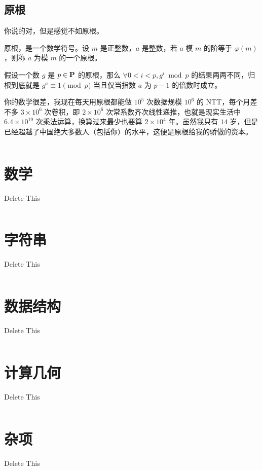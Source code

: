 \documentclass[twoside]{article}
\begin{document}
\subsection{原根}
 你说的对，但是感觉不如原根。\par 原根，是一个数学符号。设 $m$ 是正整数，$a$
 是整数，若 $a$ 模 $m$ 的阶等于 $\varphi(m)$，则称 $a$ 为模 $m$
 的一个原根。\par 假设一个数 $g$ 是 $p\in\textbf P$ 的原根，那么 $\forall
 0<i<p,g^i \bmod p$ 的结果两两不同，归根到底就是 $g^a \equiv 1 \pmod p$
 当且仅当指数 $a$ 为 $p-1$ 的倍数时成立。\par
 你的数学很差，我现在每天用原根都能做 $10^5$ 次数据规模 $10^6$ 的
 NTT，每个月差不多 $3\times10^6$ 次卷积，即 $2\times10^6$
 次常系数齐次线性递推，也就是现实生活中
 $6.4\times10^{19}$ 次乘法运算，换算过来最少也要算 $2\times10^4$
 年。虽然我只有 $14$
 岁，但是已经超越了中国绝大多数人（包括你）的水平，这便是原根给我的骄傲的资本。
\begin{lstlisting}
\end{lstlisting}
\clearpage\section{数学}
Delete This
\begin{lstlisting}
\end{lstlisting}
\clearpage\section{字符串}
Delete This
\begin{lstlisting}
\end{lstlisting}
\clearpage\section{数据结构}
Delete This
\begin{lstlisting}
\end{lstlisting}
\clearpage\section{计算几何}
Delete This
\begin{lstlisting}
\end{lstlisting}
\clearpage\section{杂项}
Delete This
\begin{lstlisting}
\end{lstlisting}
\end{document}
